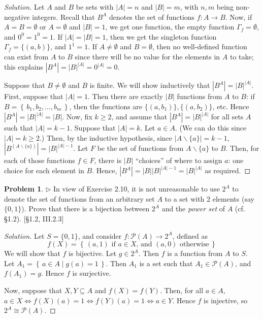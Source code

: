 \documentclass[fontsize=14pt]{scrartcl}
\theoremstyle{definition}
\newtheorem{problem-internal}{Problem}[subsection]
\newenvironment{problem}{
  \medskip
  \begin{problem-internal}
}{
  \end{problem-internal}
}
\newenvironment{solution}{
  \begin{proof}[Solution]
  \vspace{-8px}
  \setlength{\parskip}{4px}
  \setlength{\parindent}{0px}
}{
  \end{proof}
}
\newcommand{\set}[1]{\left\{\,#1\,\right\}}
\newcommand{\abs}[1]{\left|#1\right|}
\begin{document}
\begin{solution}
Let $A$ and $B$ be sets with $\abs{A}=n$ and $\abs{B}=m$, with $n,m$ being
non-negative integers. Recall that $B^A$ denotes the set of functions $f:A\to
B$. Now, if $A=B=\emptyset$ or $A=\emptyset$ and $\abs{B}=1$, we get one
function, the empty function $\Gamma_f = \emptyset$, and $0^0 = 1^0 = 1$. If
$\abs{A} = \abs{B} = 1$, then we get the singleton function
$\Gamma_f=\{(a,b)\}$, and $1^1 = 1$. If $A\neq\emptyset$ and $B=\emptyset$, then
no well-defined function can exist from $A$ to $B$ since there will be no value
for the elements in $A$ to take; this explains $\abs{B^A} = \abs{B}^{\abs{A}} =
0^{\abs{A}} = 0$.

Suppose that $B\neq\emptyset$ and $B$ is finite. We will show inductively that
$\abs{B^A} = \abs{B}^{\abs{A}}$. First, suppose that $\abs{A} = 1$.  Then there
are exactly $\abs{B}$ functions from $A$ to $B$: if $B=\set{b_1,b_2,\dots,b_m}$,
then the functions are $\{(a,b_1)\}, \{(a,b_2)\}$, etc. Hence $\abs{B^A} =
\abs{B}^{\abs{A}} = \abs{B}$.  Now, fix $k\geq 2$, and assume that $\abs{B^A} =
\abs{B}^{\abs{A}}$ for all sets $A$ such that $\abs{A}=k-1$. Suppose that
$\abs{A}=k$. Let $a\in A$. (We can do this since $\abs{A}=k\geq 2$.) Then, by
the inductive hypothesis, since $\abs{A\backslash\{a\}}=k-1$,
$\abs{B^{(A\backslash\{a\})}} = \abs{B}^{\abs{A}-1}$. Let $F$ be the set of
functions from $A\backslash\{a\}$ to $B$.  Then, for each of those functions
$f\in F$, there is $\abs{B}$ ``choices'' of where to assign $a$: one choice for
each element in $B$. Hence, $\abs{B^A} = \abs{B}\abs{B}^{\abs{A}-1} =
\abs{B}^{\abs{A}}$ as required.
\end{solution}


\begin{problem}
$\rhd$ In view of Exercise 2.10, it is not unreasonable to use $2^A$ to denote
the set of functions from an arbitrary set $A$ to a set with $2$ elements (say
$\{0,1\}$). Prove that there is a bijection between $2^A$ and the \textit{power
set} of $A$ (cf. \S1.2). [\S1.2, III.2.3]
\end{problem}

\begin{solution}
Let $S = \{0,1\}$, and consider $f:\mathcal{P}(A)\to 2^A$, defined as
%
\[ f(X) = \set{(a,1) \text{ if $a\in X$, and }(a,0) \text{ otherwise}} \]
%
We will show that $f$ is bijective. Let $g\in 2^A$. Then $f$ is a
function from $A$ to $S$. Let $A_1 = \set{a\in A\mid g(a) = 1}$. Then $A_1$ is a
set such that $A_1\in\mathcal{P}(A)$, and $f(A_1)=g$. Hence $f$ is surjective.

Now, suppose that $X,Y\subseteq A$ and $f(X) = f(Y)$. Then, for all $a\in A$,
$a\in X \iff f(X)(a) = 1 \iff f(Y)(a) = 1 \iff a\in Y$. Hence $f$ is injective,
so $2^A\cong\mathcal{P}(A)$.
\end{solution}
\end{document}
